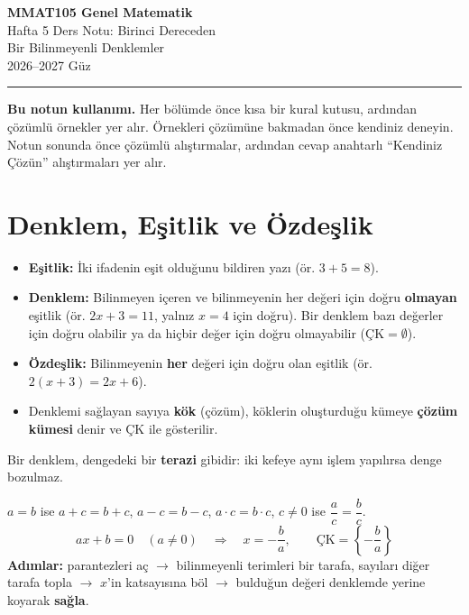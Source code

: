 \documentclass[11pt,a4paper]{article}
\begin{document}
\begin{minipage}[c]{\textwidth}
{\LARGE\bfseries\color{anamavi} MMAT105 Genel Matematik}\\[4pt]
{\large Hafta 5 Ders Notu: Birinci Dereceden\\ Bir Bilinmeyenli Denklemler}\\[6pt]
{\small 2026--2027 Güz}
\end{minipage}

\vspace{4pt}\noindent\textcolor{anamavi}{\rule{\textwidth}{1pt}}

\textbf{Bu notun kullanımı.} Her bölümde önce kısa bir kural kutusu, ardından çözümlü örnekler yer alır. Örnekleri çözümüne bakmadan önce kendiniz deneyin. Notun sonunda önce çözümlü alıştırmalar, ardından cevap anahtarlı ``Kendiniz Çözün'' alıştırmaları yer alır.

\section{Denklem, Eşitlik ve Özdeşlik}

\begin{kural}[Tanımlar]
\begin{itemize}[leftmargin=*,itemsep=1pt]
\item \textbf{Eşitlik:} İki ifadenin eşit olduğunu bildiren yazı (ör. \(3+5=8\)).
\item \textbf{Denklem:} Bilinmeyen içeren ve bilinmeyenin her değeri için doğru \textbf{olmayan} eşitlik (ör. \(2x+3=11\), yalnız \(x=4\) için doğru). Bir denklem bazı değerler için doğru olabilir ya da hiçbir değer için doğru olmayabilir (\(\text{ÇK}=\emptyset\)).
\item \textbf{Özdeşlik:} Bilinmeyenin \textbf{her} değeri için doğru olan eşitlik (ör. \(2(x+3)=2x+6\)).
\item Denklemi sağlayan sayıya \textbf{kök} (çözüm), köklerin oluşturduğu kümeye \textbf{çözüm kümesi} denir ve \(\text{ÇK}\) ile gösterilir.
\end{itemize}
Bir denklem, dengedeki bir \textbf{terazi} gibidir: iki kefeye aynı işlem yapılırsa denge bozulmaz.
\end{kural}

\begin{kural}[{{Eşitliğin özellikleri ve \(ax+b=0\) denklemi}}]
\(a=b\) ise \quad \(a+c=b+c\), \quad \(a-c=b-c\), \quad \(a\cdot c=b\cdot c\), \quad \(c\neq 0\) ise \(\dfrac{a}{c}=\dfrac{b}{c}\).
\[ax+b=0\quad(a\neq 0)\quad\Longrightarrow\quad x=-\frac{b}{a},\qquad \text{ÇK}=\left\{-\frac{b}{a}\right\}\]
\textbf{Adımlar:} parantezleri aç \(\to\) bilinmeyenli terimleri bir tarafa, sayıları diğer tarafa topla \(\to\) \(x\)'in katsayısına böl \(\to\) bulduğun değeri denklemde yerine koyarak \textbf{sağla}.
\end{kural}
\end{document}
